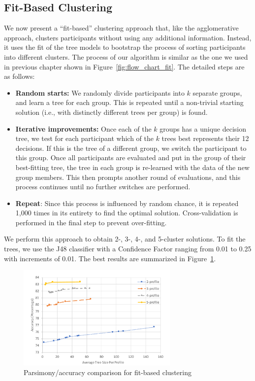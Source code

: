 \subsection{Fit-Based Clustering}
We now present a ``fit-based'' clustering approach that, like the agglomerative approach, clusters participants without using any additional information. Instead, it uses the fit of the tree models to bootstrap the process of sorting participants into different clusters. The process of our algorithm is similar as the one we used in previous chapter shown in Figure~\ref{fig:flow_chart_fit}. The detailed steps are as follows:
\begin{itemize}
	\item \textbf{Random starts:} We randomly divide participants into $k$ separate groups, and learn a tree for each group. This is repeated until a non-trivial starting solution (i.e., with distinctly different trees per group) is found. 
	
	\item \textbf{Iterative improvements:} Once each of the $k$ groups has a unique decision tree, we test for each participant which of the $k$ trees best represents their 12 decisions. If this is the tree of a different group, we switch the participant to this group. Once all participants are evaluated and put in the group of their best-fitting tree, the tree in each group is re-learned with the data of the new group members. This then prompts another round of evaluations, and this process continues until no further switches are performed.
	
	\item \textbf{Repeat}: Since this process is influenced by random chance, it is repeated 1,000 times in its entirety to find the optimal solution. Cross-validation is performed in the final step to prevent over-fitting.
\end{itemize}

We perform this approach to obtain 2-, 3-, 4-, and 5-cluster solutions. To fit the trees, we use the J48 classifier with a Confidence Factor ranging from 0.01 to 0.25 with increments of 0.01. The best results are summarized in Figure~\ref{fig:fitsum}.

\begin{figure}
	\centering
	\includegraphics[width=0.7\textwidth]{figures/fitSum.pdf}
	\caption{Parsimony/accuracy comparison for fit-based clustering}
	\label{fig:fitsum}
\end{figure}

